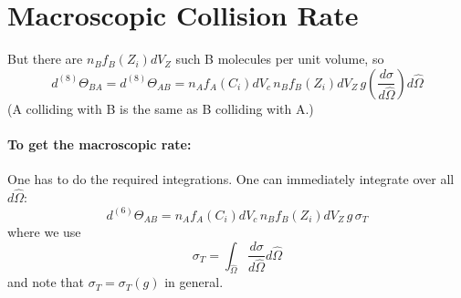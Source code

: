 \documentclass{article}
\begin{document}
\section*{Macroscopic Collision Rate}

But there are \( n_B f_B(Z_i) dV_Z \) such B molecules per unit volume, so
\[
d^{(8)}\Theta_{BA} = d^{(8)}\Theta_{AB} = n_A f_A(C_i) dV_c \, n_B f_B(Z_i) dV_Z \, g \left( \frac{d\sigma}{d\hat{\Omega}} \right) d\hat{\Omega}
\]
(A colliding with B is the same as B colliding with A.)

\paragraph{To get the macroscopic rate:}
One has to do the required integrations. One can immediately integrate over all \( d\hat{\Omega} \):
\[
d^{(6)}\Theta_{AB} = n_A f_A(C_i) dV_c \, n_B f_B(Z_i) dV_Z \, g \, \sigma_T
\]
where we use
\[
\sigma_T = \int_{\hat{\Omega}} \frac{d\sigma}{d\hat{\Omega}} d\hat{\Omega}
\]
and note that \( \sigma_T = \sigma_T(g) \) in general.
\end{document}
